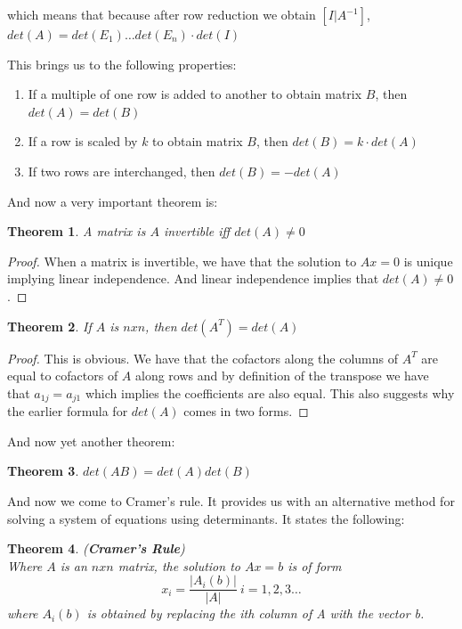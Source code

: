 \documentclass[titlepage]{article}
\newtheorem{thm}{Theorem}[subsection]
\numberwithin{equation}{subsection}
\begin{document}
which means that because after row reduction we obtain $[I | A^{-1}]$, $det(A) = det(E_{1})\ldots det(E_{n}) \cdot det(I)$

This brings us to the following properties:

\begin{enumerate}
    \item If a multiple of one row is added to another to obtain matrix $B$, then $det(A) = det(B)$
    \item If a row is scaled by $k$ to obtain matrix $B$, then $det(B) = k \cdot det(A)$
    \item If two rows are interchanged, then $det(B) = -det(A)$
\end{enumerate}

\clearpage

And now a very important theorem is:

\begin{thm}
A matrix is $A$ invertible iff $det(A) \not = 0$ 
\end{thm}

\begin{proof}
When a matrix is invertible, we have that the solution to $Ax = 0$ is unique implying linear independence. And linear independence implies that $det(A) \not = 0$. 
\end{proof}

\begin{thm}
If $A$ is $nxn$, then $det(A^{T}) = det(A)$
\end{thm}

\begin{proof}
This is obvious. We have that the cofactors along the columns of $A^{T}$ are equal to cofactors of $A$ along rows and by definition of the transpose we have that $a_{1j} = a_{j1}$ which implies the coefficients are also equal. This also suggests why the earlier formula for $det(A)$ comes in two forms. 
\end{proof}

And now yet another theorem:

\begin{thm}
$det(AB) = det(A)det(B)$
\end{thm}


And now we come to Cramer's rule. It provides us with an alternative method for solving a system of equations using determinants. It states the following:

\begin{thm}(\textbf{Cramer's Rule})
\\
Where $A$ is an $n x n$ matrix, the solution to $Ax=b$ is of form 
$$x_{i} = \frac{|A_{i}(b)|}{|A|} \ i=1,2,3\ldots$$ 
where $A_{i}(b)$ is obtained by replacing the ith column of A with the vector b.
\end{thm}
\end{document}
